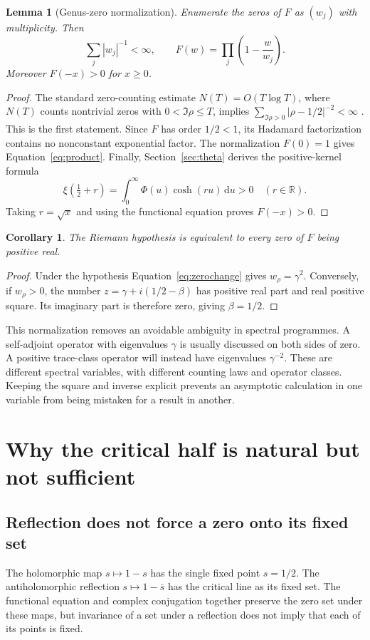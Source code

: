 \documentclass[11pt,letterpaper]{article}
\numberwithin{equation}{section}
\newtheorem{lemma}[theorem]{Lemma}
\newtheorem{corollary}[theorem]{Corollary}
\theoremstyle{definition}
\theoremstyle{remark}
\newcommand{\R}{\mathbb R}
\newcommand{\dd}{\,\mathrm d}
\begin{document}
\begin{lemma}[Genus-zero normalization]
\label{lem:product}
Enumerate the zeros of $F$ as $(w_j)$ with multiplicity. Then
\begin{equation}
 \sum_j|w_j|^{-1}<\infty,\qquad
 F(w)=\prod_j\left(1-\frac w{w_j}\right).
 \label{eq:product}
\end{equation}
Moreover $F(-x)>0$ for $x\geq0$.
\end{lemma}
\begin{proof}
The standard zero-counting estimate $N(T)=O(T\log T)$, where $N(T)$ counts nontrivial zeros with $0<\Im\rho\leq T$, implies $\sum_{\Im\rho>0}|\rho-1/2|^{-2}<\infty$ \cite{titchmarsh}. This is the first statement. Since $F$ has order $1/2<1$, its Hadamard factorization contains no nonconstant exponential factor. The normalization $F(0)=1$ gives Equation~\eqref{eq:product}. Finally, Section~\ref{sec:theta} derives the positive-kernel formula
\[
 \xi(\tfrac12+r)=\int_0^\infty\Phi(u)\cosh(ru)\dd u>0
 \quad(r\in\R).
\]
Taking $r=\sqrt x$ and using the functional equation proves $F(-x)>0$.
\end{proof}

\begin{corollary}
\label{cor:positivezeros}
The Riemann hypothesis is equivalent to every zero of $F$ being positive real.
\end{corollary}
\begin{proof}
Under the hypothesis Equation~\eqref{eq:zerochange} gives $w_\rho=\gamma^2$. Conversely, if $w_\rho>0$, the number $z=\gamma+i(1/2-\beta)$ has positive real part and real positive square. Its imaginary part is therefore zero, giving $\beta=1/2$.
\end{proof}

This normalization removes an avoidable ambiguity in spectral programmes. A self-adjoint operator with eigenvalues $\gamma$ is usually discussed on both sides of zero. A positive trace-class operator will instead have eigenvalues $\gamma^{-2}$. These are different spectral variables, with different counting laws and operator classes. Keeping the square and inverse explicit prevents an asymptotic calculation in one variable from being mistaken for a result in another.

\section{Why the critical half is natural but not sufficient}
\label{sec:half}
\subsection{Reflection does not force a zero onto its fixed set}
The holomorphic map $s\mapsto1-s$ has the single fixed point $s=1/2$. The antiholomorphic reflection $s\mapsto1-\overline s$ has the critical line as its fixed set. The functional equation and complex conjugation together preserve the zero set under these maps, but invariance of a set under a reflection does not imply that each of its points is fixed.
\end{document}
